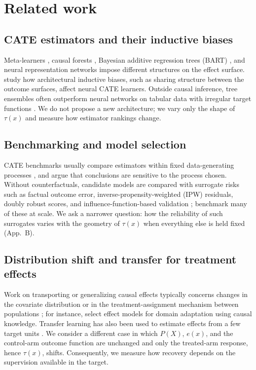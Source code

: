 \documentclass[pdflatex,sn-mathphys-num]{sn-jnl}
\begin{document}
\section{Related work}

\subsection*{CATE estimators and their inductive biases}
Meta-learners \citep{kunzel2019,nie2021,kennedy2023}, causal forests \citep{wager2018,athey2019}, Bayesian additive regression trees (BART) \citep{hill2011,chipman2010}, and neural representation networks \citep{shalit2017,johansson2016,shi2019} impose different structures on the effect surface. \citet{curth2021} study how architectural inductive biases, such as sharing structure between the outcome surfaces, affect neural CATE learners. Outside causal inference, tree ensembles often outperform neural networks on tabular data with irregular target functions \citep{grinsztajn2022}. We do not propose a new architecture; we vary only the shape of $\tau(x)$ and measure how estimator rankings change.

\subsection*{Benchmarking and model selection}
CATE benchmarks usually compare estimators within fixed data-generating processes \citep{dorie2019,curth2021benchmark}, and \citet{curth2021benchmark} argue that conclusions are sensitive to the process chosen. Without counterfactuals, candidate models are compared with surrogate risks such as factual outcome error, inverse-propensity-weighted (IPW) residuals, doubly robust scores, and influence-function-based validation \citep{rolling2014,schuler2018,saito2020,alaa2019}; \citet{mahajan2024} benchmark many of these at scale. We ask a narrower question: how the reliability of such surrogates varies with the geometry of $\tau(x)$ when everything else is held fixed (App.~B).

\subsection*{Distribution shift and transfer for treatment effects}
Work on transporting or generalizing causal effects typically concerns changes in the covariate distribution or in the treatment-assignment mechanism between populations \citep{pearl2011,bareinboim2016,dahabreh2019}; for instance, \citet{kyono2023} select effect models for domain adaptation using causal knowledge. Transfer learning has also been used to estimate effects from a few target units \citep{kunzel2018}. We consider a different case in which $P(X)$, $e(x)$, and the control-arm outcome function are unchanged and only the treated-arm response, hence $\tau(x)$, shifts. Consequently, we measure how recovery depends on the supervision available in the target.
\end{document}
